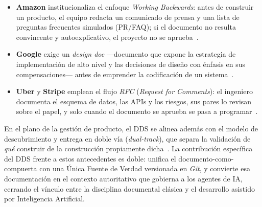 \begin{itemize}[leftmargin=*, itemsep=2pt, topsep=2pt]
    \item \textbf{Amazon} institucionaliza el enfoque \textit{Working Backwards}:
    antes de construir un producto, el equipo redacta un comunicado de prensa y una
    lista de preguntas frecuentes simulados (PR/FAQ); si el documento no resulta
    convincente y autoexplicativo, el proyecto no se aprueba~\cite{bryar2021}.

    \item \textbf{Google} exige un \textit{design doc} ---documento que expone la
    estrategia de implementación de alto nivel y las decisiones de diseño con
    énfasis en sus compensaciones--- antes de emprender la codificación de un
    sistema~\cite{ubl2020}.

    \item \textbf{Uber} y \textbf{Stripe} emplean el flujo \textit{RFC}
    (\textit{Request for Comments}): el ingeniero documenta el esquema de datos, las
    APIs y los riesgos, sus pares lo revisan sobre el papel, y solo cuando el
    documento se aprueba se pasa a programar~\cite{orosz2019}.
\end{itemize}

En el plano de la gestión de producto, el DDS se alinea además con el modelo de
descubrimiento y entrega en doble vía (\textit{dual-track}), que separa la
validación de \textit{qué} construir de la construcción propiamente
dicha~\cite{cagan2018}. La contribución específica del DDS frente a estos
antecedentes es doble: unifica el documento-como-compuerta con una Única Fuente de
Verdad versionada en \textit{Git}, y convierte esa documentación en el contexto
autoritativo que gobierna a los agentes de IA, cerrando el vínculo entre la
disciplina documental clásica y el desarrollo asistido por Inteligencia Artificial.

